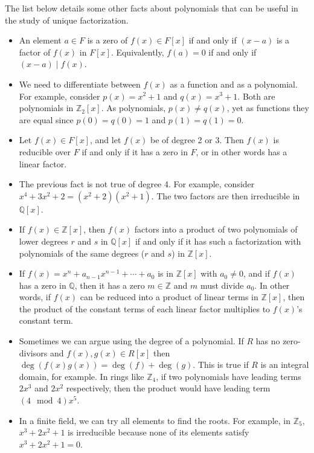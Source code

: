 \documentclass[11pt]{amsart}
\theoremstyle{definition}
\newcommand{\rationals}{\mathbb{Q}}
\newcommand{\integers}{\mathbb{Z}}
\begin{document}
The list below details some other facts about polynomials that can be useful in the study of unique factorization.
\begin{itemize}
	\item{
		An element $a \in F$ is a zero of $f(x) \in F[x]$ if and only if $(x - a)$ is a factor of $f(x)$ in $F[x]$. Equivalently, $f(a) = 0$ if and 
		only if $(x - a) \mid f(x)$.
	}
	\item{
		We need to differentiate between $f(x)$ as a function and as a polynomial. For example, consider $p(x) = x^2 + 1$ and 
		$q(x) = x^3 + 1$. Both are polynomials in $\integers_2[x]$. As polynomials, $p(x) \neq q(x)$, yet as functions they are equal 
		since $p(0) = q(0) = 1$ and $p(1) = q(1) = 0$.
	}
	\item{
		Let $f(x) \in F[x]$, and let $f(x)$ be of degree 2 or 3. Then $f(x)$ is reducible over $F$ if and only if it has a zero in $F$, or in other
		words has a linear factor.
	}
	\item{
		The previous fact is not true of degree 4. For example, consider $x^4 + 3x^2 + 2 = (x^2 + 2)(x^2 + 1)$. The two factors are then
		irreducible in $\rationals[x]$.
	}
	\item{
		If $f(x) \in \integers[x]$, then $f(x)$ factors into a product of two polynomials of lower degrees $r$ and $s$ in $\rationals[x]$ if
		and only if it has such a factorization with polynomials of the same degrees ($r$ and $s$) in $\integers[x]$.
	}
	\item{
		If $f(x) = x^n + a_{n-1}x^{n-1} + \cdots + a_0$ is in $\integers[x]$ with $a_0 \neq 0$, and if $f(x)$ has a zero in $\rationals$, then
		it has a zero $m \in \integers$ and $m$ must divide $a_0$. In other words, if $f(x)$ can be reduced into a product of linear terms
		in $\integers[x]$, then the product of the constant terms of each linear factor multiplies to $f(x)$'s constant term.
	}
	\item{
		Sometimes we can argue using the degree of a polynomial. If $R$ has no zero-divisors and $f(x), g(x) \in R[x]$ then
		$\deg(f(x)g(x)) = \deg(f) + \deg(g)$. This is true if $R$ is an integral domain, for example. In rings like $\integers_4$, if two polynomials
		have leading terms $2x^3$ and $2x^2$ respectively, then the product would have leading term $(4 \mod 4)x^5$.
	}
	\item{
		In a finite field, we can try all elements to find the roots. For example, in $\integers_5$, $x^3 + 2x^2 + 1$ is irreducible
		because none of its elements satisfy $x^3 + 2x^2 + 1 = 0$.
	}
\end{itemize}
\newpage
\end{document}
